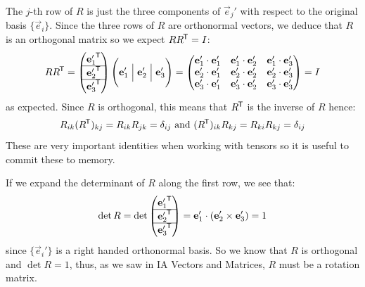 \documentclass[../main.tex]{subfiles}
\begin{document}
The $j$-th row of $R$ is just the three components of $\vec{e}_j'$ with respect to the original basis $\{\vec{e}_i\}$.
Since the three rows of $R$ are orthonormal vectors, we deduce that $R$ is an orthogonal matrix so we expect $R R^{{\mkern-1.5mu\mathsf{T}}} = I$:
\[
  R R^{{\mkern-1.5mu\mathsf{T}}} = \begin{pmatrix}
  {\mathbf{\bm{e}}_1'}^{{\mkern-1.5mu\mathsf{T}}} \\
  \hline
  {\mathbf{\bm{e}}_2'}^{{\mkern-1.5mu\mathsf{T}}} \\
  \hline
  {\mathbf{\bm{e}}_3'}^{{\mkern-1.5mu\mathsf{T}}} \\
  \end{pmatrix}
  \Biggl(\mathbf{\bm{e}}_1' \Bigm| \mathbf{\bm{e}}_2' \Bigm| \mathbf{\bm{e}}_3'\Biggr) = \begin{pmatrix}
  \mathbf{\bm{e}}_1' \cdot \mathbf{\bm{e}}_1' & \mathbf{\bm{e}}_1' \cdot \mathbf{\bm{e}}_2' & \mathbf{\bm{e}}'_1 \cdot \mathbf{\bm{e}}_3' \\
  \mathbf{\bm{e}}_2' \cdot \mathbf{\bm{e}}_1' & \mathbf{\bm{e}}_2' \cdot \mathbf{\bm{e}}_2' & \mathbf{\bm{e}}_2' \cdot \mathbf{\bm{e}}_3' \\
  \mathbf{\bm{e}}_3' \cdot \mathbf{\bm{e}}_1' & \mathbf{\bm{e}}_3' \cdot \mathbf{\bm{e}}_2' & \mathbf{\bm{e}}_3' \cdot \mathbf{\bm{e}}_3' \\
  \end{pmatrix} = I
\]
as expected.
Since $R$ is orthogonal, this means that $R^{{\mkern-1.5mu\mathsf{T}}}$ is the inverse of $R$ hence:
\begin{equation}
  R_{i k}(R^{{\mkern-1.5mu\mathsf{T}}})_{k j} = R_{i k}R_{j k} = \delta_{i j} \text{ and } (R^{{\mkern-1.5mu\mathsf{T}}})_{i k}R_{k j} = R_{k i}R_{k j} = \delta_{i j} \label{RDelta}
\end{equation}
These are very important identities when working with tensors so it is useful to commit these to memory.

If we expand the determinant of $R$ along the first row, we see that:
\[
  \det R = \det \begin{pmatrix}
  {\mathbf{\bm{e}}_1'}^{{\mkern-1.5mu\mathsf{T}}} \\
  \hline
  {\mathbf{\bm{e}}_2'}^{{\mkern-1.5mu\mathsf{T}}} \\
  \hline
  {\mathbf{\bm{e}}_3'}^{{\mkern-1.5mu\mathsf{T}}} \\
  \end{pmatrix} = \mathbf{\bm{e}}_1' \cdot (\mathbf{\bm{e}}_2' \times \mathbf{\bm{e}}_3') = 1
\]
since $\{\vec{e}_i'\}$ is a right handed orthonormal basis.
So we know that $R$ is orthogonal and $\det R = 1$, thus, as we saw in IA Vectors and Matrices, $R$ must be a rotation matrix.
\end{document}

